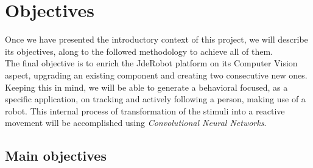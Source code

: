 \chapter{Objectives}
Once we have presented the introductory context of this project, we will describe its objectives, along to the followed methodology to achieve all of them.\\

The final objective is to enrich the JdeRobot platform on its Computer Vision aspect, upgrading an existing component and creating two consecutive new ones. Keeping this in mind, we will be able to generate a behavioral focused, as a specific application, on tracking and actively following a person, making use of a robot. This internal process of transformation of the stimuli into a reactive movement will be accomplished using \textit{Convolutional Neural Networks}.\\


\section{Main objectives}

